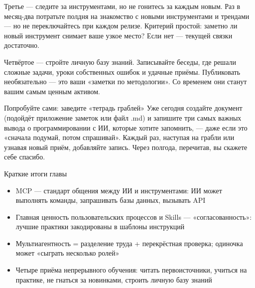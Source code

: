 Третье — следите за инструментами, но не гонитесь за каждым новым. Раз в месяц-два потратьте полдня на знакомство с новыми инструментами и трендами — но не переключайтесь при каждом релизе. Критерий простой: заметно ли новый инструмент снимает ваше узкое место? Если нет — текущей связки достаточно.

Четвёртое — стройте личную базу знаний. Записывайте беседы, где решали сложные задачи, уроки собственных ошибок и удачные приёмы. Публиковать необязательно — это ваши «заметки по методологии». Со временем они станут вашим самым ценным активом.

\begin{tcbpractice}{Попробуйте сами: заведите «тетрадь граблей»}
Уже сегодня создайте документ (подойдёт приложение заметок или файл .md) и запишите три самых важных вывода о программировании с ИИ, которые хотите запомнить, — даже если это «сначала подумай, потом спрашивай». Каждый раз, наступая на грабли или узнавая новый приём, добавляйте запись. Через полгода, перечитав, вы скажете себе спасибо.

\end{tcbpractice}

\begin{tcbsummary}{Краткие итоги главы}
\begin{itemize}
  \item MCP — стандарт общения между ИИ и инструментами: ИИ может выполнять команды, запрашивать базы данных, вызывать API
  \item Главная ценность пользовательских процессов и Skills — «согласованность»: лучшие практики закодированы в шаблоны инструкций
  \item Мультиагентность = разделение труда + перекрёстная проверка; одиночка может «сыграть несколько ролей»
  \item Четыре приёма непрерывного обучения: читать первоисточники, учиться на практике, не гнаться за новинками, строить личную базу знаний
\end{itemize}

\end{tcbsummary}
